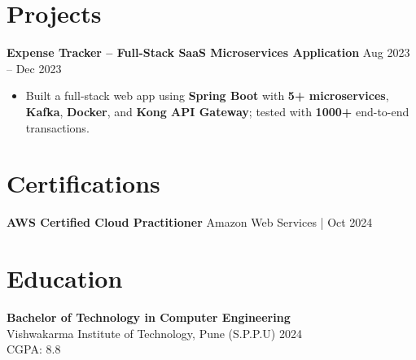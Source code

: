 \documentclass[letterpaper,10pt]{article}
\begin{document}
\section*{Projects}
\textbf{Expense Tracker -- Full-Stack SaaS Microservices Application} \hfill Aug 2023 -- Dec 2023
\begin{itemize}[leftmargin=*]
    \item Built a full-stack web app using \textbf{Spring Boot} with \textbf{5+ microservices}, \textbf{Kafka}, \textbf{Docker}, and \textbf{Kong API Gateway}; tested with \textbf{1000+} end-to-end transactions.
\end{itemize}

\section*{Certifications}
\textbf{AWS Certified Cloud Practitioner} \hfill Amazon Web Services \;|\; Oct 2024 \\

\section*{Education}

\textbf{Bachelor of Technology in Computer Engineering} \\
Vishwakarma Institute of Technology, Pune (S.P.P.U) \hfill 2024 \\
CGPA: 8.8
\end{document}
